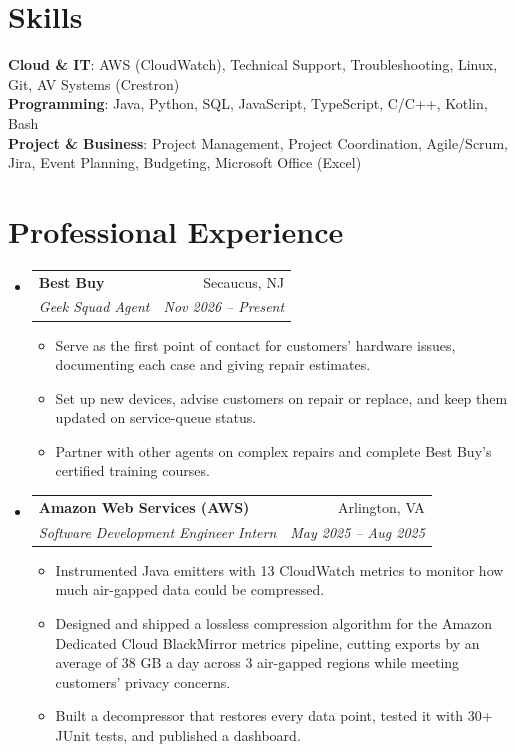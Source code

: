 \documentclass[letterpaper,11pt]{article}
\makeatletter
\newcommand{\resumeItem}[1]{\item\small{#1}}
\newcommand{\resumeSubheading}[4]{
  \vspace{-2pt}\item
    \begin{tabular*}{0.97\textwidth}[t]{l@{\extracolsep{\fill}}r}
      \textbf{#1} & #2 \\
      \textit{\small#3} & \textit{\small #4} \\
    \end{tabular*}\vspace{-7pt}
}
\newcommand{\resumeSubHeadingListStart}{\begin{itemize}[leftmargin=0.15in, label={}, itemsep=1pt, parsep=0pt, topsep=2pt]}
\newcommand{\resumeSubHeadingListEnd}{\end{itemize}}
\newcommand{\resumeItemListStart}{\begin{itemize}[topsep=6pt,itemsep=0pt,parsep=0pt,partopsep=0pt]}
\newcommand{\resumeItemListEnd}{\end{itemize}\vspace{-5pt}}
\makeatother
\begin{document}
\section{Skills}
\begin{itemize}[leftmargin=0.15in, label={}]
    \small{\item{
      \textbf{Cloud \& IT}{: AWS (CloudWatch), Technical Support, Troubleshooting, Linux, Git, AV Systems (Crestron)} \\
      \textbf{Programming}{: Java, Python, SQL, JavaScript, TypeScript, C/C++, Kotlin, Bash} \\
      \textbf{Project \& Business}{: Project Management, Project Coordination, Agile/Scrum, Jira, Event Planning, Budgeting, Microsoft Office (Excel)}
    }}
\end{itemize}

\section{Professional Experience}
  \resumeSubHeadingListStart
    \resumeSubheading
      {Best Buy}{Secaucus, NJ}
      {Geek Squad Agent}{Nov 2026 -- Present}
      \resumeItemListStart
        \resumeItem{Serve as the first point of contact for customers' hardware issues, documenting each case and giving repair estimates.}
        \resumeItem{Set up new devices, advise customers on repair or replace, and keep them updated on service-queue status.}
        \resumeItem{Partner with other agents on complex repairs and complete Best Buy's certified training courses.}
      \resumeItemListEnd
    \resumeSubheading
      {Amazon Web Services (AWS)}{Arlington, VA}
      {Software Development Engineer Intern}{May 2025 -- Aug 2025}
      \resumeItemListStart
        \resumeItem{Instrumented Java emitters with 13 CloudWatch metrics to monitor how much air-gapped data could be compressed.}
        \resumeItem{Designed and shipped a lossless compression algorithm for the Amazon Dedicated Cloud BlackMirror metrics pipeline, cutting exports by an average of 38 GB a day across 3 air-gapped regions while meeting customers' privacy concerns.}
        \resumeItem{Built a decompressor that restores every data point, tested it with 30+ JUnit tests, and published a dashboard.}
      \resumeItemListEnd
  \resumeSubHeadingListEnd
\end{document}
